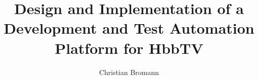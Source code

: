 \author{Christian Bromann}
\title{Design and Implementation of a Development and Test Automation Platform for HbbTV}





\frontmatter
    
   	\thispagestyle{empty}
    \cleardoublepage

    
    \thispagestyle{empty}
    \cleardoublepage

    
    \thispagestyle{empty}
    \cleardoublepage

    
    \thispagestyle{empty}
    \cleardoublepage


    
    \thispagestyle{empty}
    \cleardoublepage

    
    \thispagestyle{empty}

    \tableofcontents
    \thispagestyle{empty}

\mainmatter %

    
    
    
    
    
    
    

\backmatter %
    \listoffigures
    \thispagestyle{empty}

    \listoflistings
    \thispagestyle{empty}

    

    
    

    


